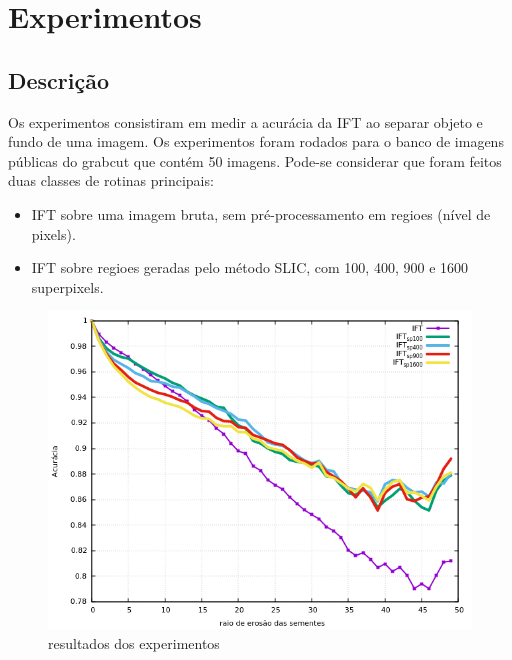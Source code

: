 \chapter{Experimentos}
\label{cap:exp}
\section{Descrição}


Os experimentos consistiram em medir a acurácia da IFT ao separar objeto e fundo de uma imagem. Os experimentos foram rodados para o banco de imagens públicas do grabcut que contém 50 imagens. 
Pode-se considerar que foram feitos duas classes de rotinas principais:

\begin{itemize}
\item IFT sobre uma imagem bruta, sem pré-processamento em regioes (nível de pixels).
\item IFT sobre regioes geradas pelo método SLIC, com 100, 400, 900 e 1600 superpixels.
\end{itemize}



\begin{figure}[!h]
\begin{center}
\includegraphics[width=14cm]{figuras/resultados}
\caption{\label{fig:resultados} resultados dos experimentos}
\end{center}
\end{figure}
